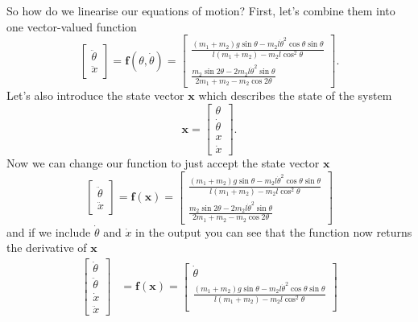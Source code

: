 \documentclass{article}
\renewcommand{\vec}[1]{\boldsymbol{\mathbf{#1}}}
\begin{document}
So how do we linearise our equations of motion? First, let's combine them into one vector-valued function \[\begin{bmatrix}
    \ddot{\theta} \\
    \ddot{x}
  \end{bmatrix} = \vec{f}(\theta, \dot{\theta}) = \begin{bmatrix}
    \frac{(m_1 + m_2) g \sin \theta - m_2 l \dot{\theta}^2 \cos \theta \sin \theta}{l (m_1 + m_2) - m_2 l \cos^2 \theta} \\
    \frac{m_2 \sin 2 \theta - 2 m_2 l \dot{\theta}^2 \sin \theta}{2 m_1 + m_2 - m_2 \cos 2 \theta}
\end{bmatrix}.\] Let's also introduce the state vector $\vec{x}$ which describes the state of the system \[\vec{x} = \begin{bmatrix}
    \theta       \\
    \dot{\theta} \\
    x            \\
    \dot{x}
\end{bmatrix}.\] Now we can change our function to just accept the state vector $\vec{x}$ \[\begin{bmatrix}
    \ddot{\theta} \\
    \ddot{x}
  \end{bmatrix} = \vec{f}(\vec{x}) = \begin{bmatrix}
    \frac{(m_1 + m_2) g \sin \theta - m_2 l \dot{\theta}^2 \cos \theta \sin \theta}{l (m_1 + m_2) - m_2 l \cos^2 \theta} \\
    \frac{m_2 \sin 2 \theta - 2 m_2 l \dot{\theta}^2 \sin \theta}{2 m_1 + m_2 - m_2 \cos 2 \theta}
\end{bmatrix}\] and if we include $\dot{\theta}$ and $\dot{x}$ in the output you can see that the function now returns the derivative of $\vec{x}$ \begin{align*}
  \begin{bmatrix}
    \dot{\theta}  \\
    \ddot{\theta} \\
    \dot{x}       \\
    \ddot{x}
  \end{bmatrix} & = \vec{f}(\vec{x}) = \begin{bmatrix}
                                         \dot{\theta}                                                                                                         \\
                                         \frac{(m_1 + m_2) g \sin \theta - m_2 l \dot{\theta}^2 \cos \theta \sin \theta}{l (m_1 + m_2) - m_2 l \cos^2 \theta} \\

\end{bmatrix}
\end{align*}
\end{document}
